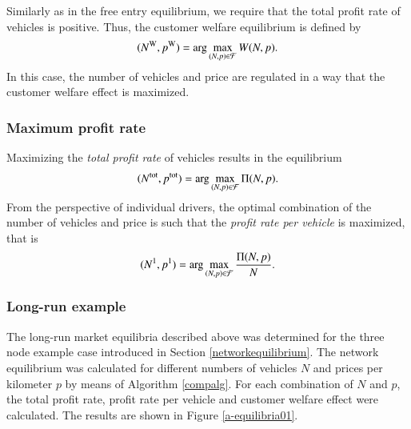 \documentclass[dissertation,draft*]{aaltoseries}
\begin{document}
Similarly as in the free entry equilibrium, we require that the total profit rate of
vehicles is positive. Thus, the customer welfare equilibrium is defined by 
\begin{align}
\label{welfare}
(N^{\rm W},p^{\rm W}) = \arg \max_{(N,p) \in \mathcal{F}} W(N,p). 
\end{align}
In this case, the number of vehicles and price are regulated in a way that the 
customer welfare effect is maximized.

\subsubsection{Maximum profit rate}
Maximizing the \emph{total profit rate} of vehicles results in the equilibrium
\begin{align}
\label{totalprofit}
(N^{\rm tot},p^{\rm tot}) = \arg \max_{(N,p) \in \mathcal{F}} \Pi(N,p). 
\end{align}
From the perspective of individual drivers, the optimal combination of the
number of vehicles and price is such that the \emph{profit rate per vehicle}
is maximized, that is 
\begin{align}
\label{pervehicle}
(N^{\rm 1},p^{\rm 1}) = \arg \max_{(N,p) \in \mathcal{F}} \frac{\Pi(N,p)}{N}. 
\end{align}
 

\subsubsection{Long-run example}
The long-run market equilibria described above was determined for the three node example case introduced
in Section \ref{networkequilibrium}. The network equilibrium was calculated for different numbers
of vehicles $N$ and prices per kilometer $p$ by means of Algorithm \ref{compalg}.
For each combination of $N$ and $p$, the total profit rate, profit 
rate per vehicle and customer welfare effect were calculated. The results are shown in Figure \ref{a-equilibria01}.
\end{document}
